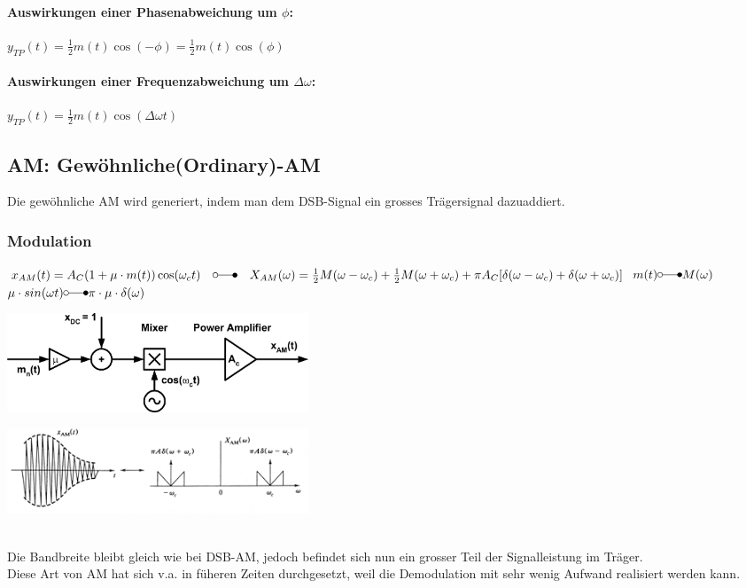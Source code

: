 \paragraph{Auswirkungen einer Phasenabweichung um $\phi$:} $y_{TP}(t) = \frac{1}{2}
m(t) \cos(-\phi)= \frac{1}{2} m(t) \cos(\phi) $
\paragraph{Auswirkungen einer Frequenzabweichung um $\Delta \omega$:} $y_{TP}(t) =
\frac{1}{2} m(t) \cos(\Delta \omega t)$\\

\newpage

\subsection{AM: Gewöhnliche(Ordinary)-AM}
Die gewöhnliche AM wird generiert, indem man dem DSB-Signal ein grosses Trägersignal dazuaddiert.

\subsubsection{Modulation}

$x_{AM}(t) = A_C (1 + \mu \cdot m(t)) \cos(\omega_c t)
	\quad \laplace \quad X_{AM}(\omega) = \frac{1}{2}M(\omega - \omega_c) + \frac{1}{2}M(\omega + \omega_c) + \pi A_C [\delta (\omega - \omega_c) + \delta (\omega + \omega_c)]$
	$m(t) \laplace M(\omega)$ \\
	$\mu \cdot sin(\omega t) \laplace \pi \cdot \mu \cdot \delta(\omega)$

\begin{minipage}[]{9cm}
	\includegraphics[width=9cm]{bilder/am_oam_modulation.png}
\end{minipage}
\begin{minipage}[]{9cm}
    \includegraphics[width=9cm]{bilder/am_oam_spektrum.png}
\end{minipage}\\
Die Bandbreite bleibt gleich wie bei DSB-AM, jedoch befindet sich nun ein grosser Teil der
Signalleistung im Träger. \\
Diese Art von AM hat sich v.a. in füheren Zeiten durchgesetzt, weil die Demodulation mit sehr
wenig Aufwand realisiert werden kann. 

